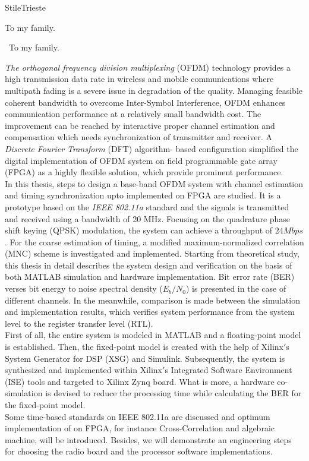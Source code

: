 \documentclass[12pt,twoside,cucitura]{toptesi}
\begin{document}
\english
{}

\expandafter\ifx\csname StileTrieste\endcsname\relax
    \frontespizio
\else
    \paginavuota
    \begin{dedica}
       To my family.

        \textdagger\ To my family.
    \end{dedica}
    \tomo
\fi


\sommario
\textit{The orthogonal frequency division multiplexing} (OFDM) technology provides a high transmission data rate in wireless and mobile communications where multipath fading is a severe issue in degradation of the quality. Managing feasible coherent bandwidth to overcome Inter-Symbol Interference, OFDM enhances communication performance at a relatively small bandwidth cost. The improvement can be reached by interactive proper channel estimation and compensation which needs synchronization of transmitter and receiver. A \textit{Discrete Fourier Transform} (DFT) algorithm- based configuration simplified the digital implementation of OFDM system on field programmable gate array (FPGA) as a highly flexible solution, which provide prominent performance.\\
In this thesis, steps to design a base-band OFDM system with channel estimation and timing synchronization upto implemented on FPGA are studied. It is a prototype based on the \textit{IEEE 802.11a} standard and the signals is transmitted and received using a bandwidth of 20 MHz. Focusing on the quadrature phase shift keying (QPSK) modulation, the system can achieve a throughput of $24 Mbps$. For the coarse estimation of timing, a modified maximum-normalized correlation (MNC) scheme is investigated and implemented. Starting from theoretical study, this thesis in detail describes the system design and verification on the basis of both MATLAB simulation and hardware implementation. Bit error rate (BER) verses bit energy to noise spectral density ($E_{b}/N_{0}$) is presented in the case of different channels. In the meanwhile, comparison is made between the simulation and implementation results, which verifies system performance from the system level to the register transfer level (RTL).\\
First of all, the entire system is modeled in MATLAB and a floating-point model is established. Then, the fixed-point model is created with the help of Xilinx$'$s System Generator for DSP (XSG) and Simulink. Subsequently, the system is synthesized and implemented within Xilinx$'$s Integrated Software Environment (ISE) tools and targeted to Xilinx Zynq board. What is more, a hardware co-simulation is devised to reduce the processing time while calculating the BER for the fixed-point model.\\
Some time-based standards on IEEE 802.11a are discussed and optimum implementation of on FPGA, for instance Cross-Correlation and algebraic machine, will be introduced. Besides, we will demonstrate an engineering steps for choosing the radio board and the processor software implementations.\\
\end{document}
